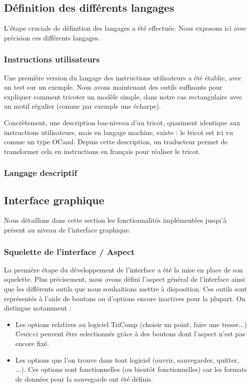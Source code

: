 \documentclass{article}
\begin{document}
\subsection{Définition des différents langages}

L'étape cruciale de définition des langages a été effectuée. Nous exposons ici avec précision ces différents langages.

\subsubsection{Instructions utilisateurs}

Une première version du langage des instructions utilisateurs a été établie, avec un test sur un exemple. Nous avons maintenant des outils 
suffisants pour expliquer comment tricoter un modèle simple, dans notre cas rectangulaire avec un motif régulier (comme par exemple une écharpe). 

Concrètement, une description bas-niveau d'un tricot, quasiment identique aux instructions utilisateurs, mais en langage machine, existe : le tricot 
est ici vu comme un type OCaml. Depuis cette description, un traducteur permet de transformer cela en instructions en français pour réaliser le tricot.

\subsubsection{Langage descriptif}

\subsection{Interface graphique}

Nous détaillons dans cette section les fonctionnalités implémentées jusqu'à présent au niveau de l'interface graphique.

\subsubsection{Squelette de l'interface / Aspect}

La première étape du développement de l'interface a été la mise en place de son squelette. Plus précisement, nous avons défini l'aspect 
général de l'interface ainsi que les différents outils que nous souhaitions mettre à disposition. Ces outils sont représentés à l'aide de 
boutons ou d'options encore inactives pour la plupart. On distingue notamment :
\begin{itemize}
  \item Les options relatives au logiciel TriComp (choisir un point, faire une tresse...) Ceux-ci peuvent être selectionnés grâce à des 
boutons dont l'aspect n'est pas encore fixé. %
  \item Les options que l'on trouve dans tout logiciel (ouvrir, sauvegarder, quitter, ...). Ces options sont fonctionnelles (ou bientôt 
fonctionnelles) car les formats de données pour la sauvegarde ont été définis.
\end{itemize}
\end{document}
